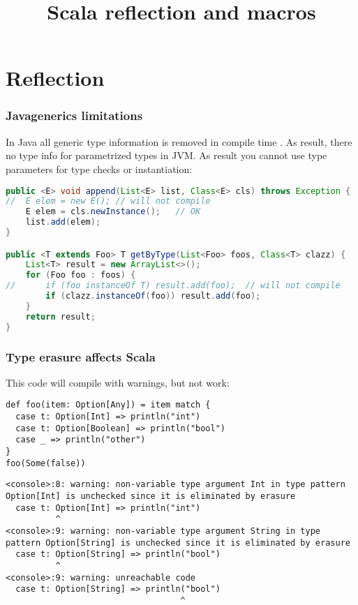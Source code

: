 

\title{Scala reflection and macros}



\begin{frame}
    \titlepage
\end{frame}

\section{Reflection}

\begin{frame}[fragile]
\frametitle{Java\texttrademark generics limitations}

In Java all generic type information is removed in compile time \cite{erasure}.  As result, there no type info for
parametrized types in JVM.  As result you cannot use type parameters for type checks or instantiation:

\begin{lstlisting}[language=Java]
public <E> void append(List<E> list, Class<E> cls) throws Exception {
//  E elem = new E(); // will not compile
    E elem = cls.newInstance();   // OK
    list.add(elem);
}

public <T extends Foo> T getByType(List<Foo> foos, Class<T> clazz) {
    List<T> result = new ArrayList<>();
    for (Foo foo : foos) {
//      if (foo instanceOf T) result.add(foo);  // will not compile
        if (clazz.instanceOf(foo)) result.add(foo);
    }
    return result;
}
\end{lstlisting}
\end{frame}

\begin{frame}[fragile]
\frametitle{Type erasure affects Scala}
This code will compile with warnings, but not work:
\begin{lstlisting}
def foo(item: Option[Any]) = item match {
  case t: Option[Int] => println("int")
  case t: Option[Boolean] => println("bool")
  case _ => println("other")
}
foo(Some(false))
\end{lstlisting}
\begin{lstlisting}[breaklines=true]
<console>:8: warning: non-variable type argument Int in type pattern Option[Int] is unchecked since it is eliminated by erasure
  case t: Option[Int] => println("int")
          ^
<console>:9: warning: non-variable type argument String in type pattern Option[String] is unchecked since it is eliminated by erasure
  case t: Option[String] => println("bool")
          ^
<console>:9: warning: unreachable code
  case t: Option[String] => println("bool")
                                   ^
\end{lstlisting}
\end{frame}

